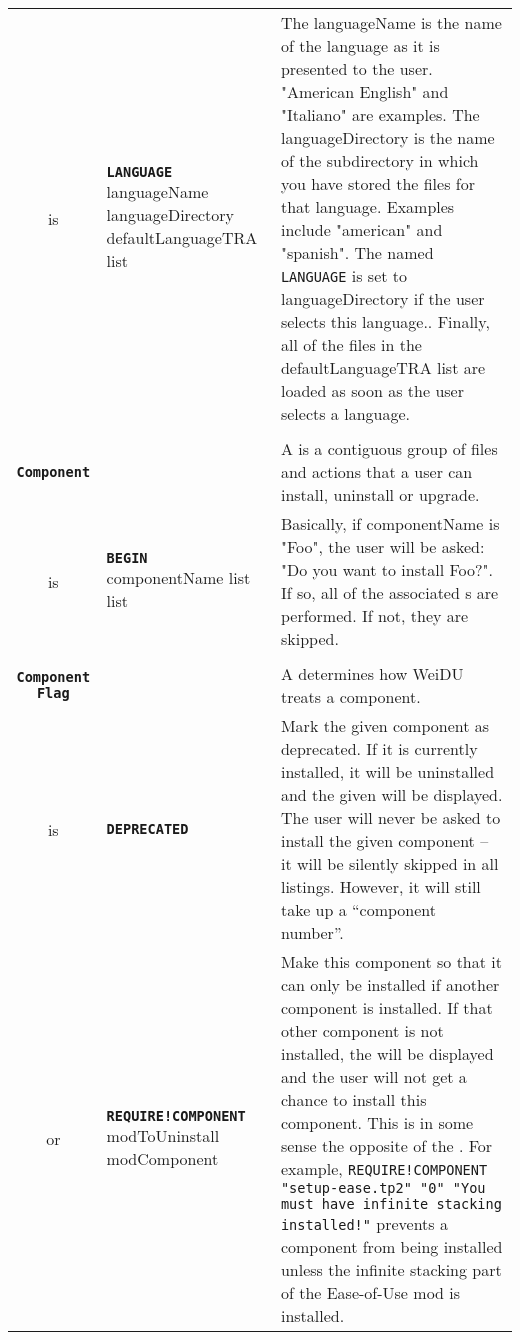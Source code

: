 \documentclass{article}
\def\ttref#1{\ahrefloc{#1}{\tt #1}}
\def\DEFINE#1{{\tt \bf #1}\label{#1}\index{#1}}
\def\DEFSYN#1{{\tt \bf #1}\index{#1}}
\def\t#1{{\tt #1}}
\def\Slist{{\color{red} list }}
\begin{document}
\begin{tabular}{cp{10in}|p{10in}}
  is & \DEFINE{LANGUAGE} languageName
       languageDirectory
       defaultLanguageTRA \Slist &
       The languageName is the name of the language as it is presented to
       the user. "American English" and "Italiano" are
       examples. The languageDirectory is the name of the subdirectory in
       which you have stored the \ttref{TRA} files for that language.
       Examples include "american" and "spanish". The \ttref{variable}
       named \t{LANGUAGE} is set to languageDirectory if the user selects
       this language.. Finally, all of the \ttref{TRA} files in the
       defaultLanguageTRA list are loaded as soon as the user selects a
       language.  \\
\\

\DEFINE{Component} & &
  A \ttref{Component} is a contiguous group of files and actions that a
  user can install, uninstall or upgrade. \\

  is & \DEFSYN{BEGIN} componentName
    \ttref{Component Flag} \Slist
    \ttref{TP2 Action} \Slist &
    Basically, if componentName is "Foo", the user will be asked: "Do you
    want to install Foo?". If so, all of the associated \ttref{TP2 Action}s
    are performed. If not, they are skipped. \\

\\

\DEFINE{Component Flag} &&
  A \ttref{Component Flag} determines how WeiDU treats a component. \\

  is & \DEFINE{DEPRECATED} \ttref{String} &
      Mark the given component as deprecated. If it is currently installed,
      it will be uninstalled and the given \ttref{String} will be
      displayed. The user will never be asked to install the given
      component -- it will be silently skipped in all listings. However, it
      will still take up a ``component number''. \\

  or & \DEFINE{REQUIRE!COMPONENT} modToUninstall modComponent
      \ttref{String} &
      Make this component so that it can only be installed if another
      component is installed. If that other component is not installed, the
      \ttref{String} will be displayed and the user will not get a chance
      to install this component. This is in some sense the opposite of the
      \ttref{UNINSTALL} \ttref{TP2 Action}. For example,
      \t{REQUIRE!COMPONENT "setup-ease.tp2" "0" "You must have infinite
      stacking installed!"} prevents a component from being installed
      unless the infinite stacking part of the Ease-of-Use mod is
      installed.  \\


\end{tabular}
\end{document}
